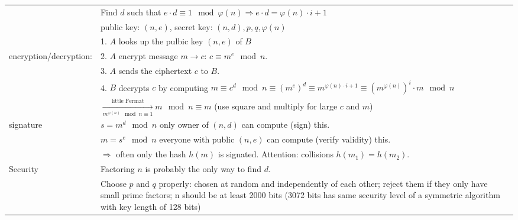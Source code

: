 \begin{tabular}{|l| p{14.7cm}|}
									&	Find $d$ such that $e\cdot d\equiv 1 \mod \varphi(n) \Rightarrow e\cdot d = \varphi(n) \cdot i + 1$\\
									&	public key: $(n,e)$, secret key: $(n,d), p,q, \varphi(n)$\\
									\cline{2-2}
									&	1. $A$ looks up the pulbic key $(n,e)$ of $B$\\
	encryption/decryption:			&	2. $A$ encrypt message $m \to c$: $c \equiv m^e \mod n$.\\
									&	3. $A$ sends the ciphertext $c$ to $B$.\\
									&	4. $B$ decrypts $c$ by computing $m\equiv c^d \mod n \equiv (m^{e})^d \equiv  m^{\varphi(n) \cdot i + 1} \equiv  \left(m^{\varphi(n)}\right)^i \cdot m \mod n$\\
									&	$\xrightarrow[m^{\varphi(n)} \mod n\equiv 1]{\text{little Fermat}} m \mod n \equiv m $  (use square and multiply for large $c$ and $m$)\\
									\cline{2-2}
	signature						&	$s=m^d \mod n$ only owner of $(n,d)$ can compute (sign) this.\\
									&	$m=s^e \mod n$ everyone with public $(n,e)$ can compute (verify validity) this.\\
									&	$\Rightarrow$ often only the hash $h(m)$ is signated. Attention: 
										collisions $h(m_1)=h(m_2)$.\\
									\cline{2-2}
	Security        & Factoring $n$ is probably the only way to find $d$.\\
									& Choose $p$ and $q$ properly: chosen at random and independently of each other; reject them if they only have small prime factors; n should be at least 2000 bits (3072 bits has same security level of a symmetric algorithm with key length of 128 bits)\\
	\hline 
\end{tabular}
